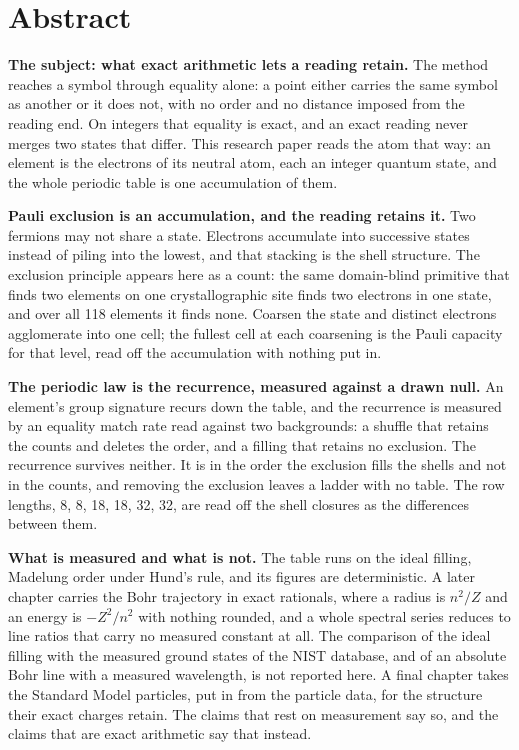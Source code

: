 \chapter*{Abstract}

\textbf{The subject: what exact arithmetic lets a reading retain.} The method reaches a symbol through
equality alone: a point either carries the same symbol as another or it does not, with no order and
no distance imposed from the reading end. On integers that equality is exact, and an exact reading
never merges two states that differ. This research paper reads the atom that way: an element is the
electrons of its neutral atom, each an integer quantum state, and the whole periodic table is one
accumulation of them.

\textbf{Pauli exclusion is an accumulation, and the reading retains it.} Two fermions may not share a
state. Electrons accumulate into successive states instead of piling into the lowest, and that
stacking is the shell structure. The exclusion principle appears here as a count: the same
domain-blind primitive that finds two elements on one crystallographic site finds two electrons in
one state, and over all 118 elements it finds none. Coarsen the state and distinct electrons
agglomerate into one cell; the fullest cell at each coarsening is the Pauli capacity for that level,
read off the accumulation with nothing put in.

\textbf{The periodic law is the recurrence, measured against a drawn null.} An element's group
signature recurs down the table, and the recurrence is measured by an equality match rate read
against two backgrounds: a shuffle that retains the counts and deletes the order, and a filling that
retains no exclusion. The recurrence survives neither. It is in the order the exclusion fills the
shells and not in the counts, and removing the exclusion leaves a ladder with no table. The row
lengths, 8, 8, 18, 18, 32, 32, are read off the shell closures as the differences between them.

\textbf{What is measured and what is not.} The table runs on the ideal filling, Madelung order under
Hund's rule, and its figures are deterministic. A later chapter carries the Bohr trajectory in exact
rationals, where a radius is $n^2/Z$ and an energy is $-Z^2/n^2$ with nothing rounded, and a whole
spectral series reduces to line ratios that carry no measured constant at all. The comparison of the
ideal filling with the measured ground states of the NIST database, and of an absolute Bohr line with
a measured wavelength, is not reported here. A final chapter takes the Standard Model particles, put
in from the particle data, for the structure their exact charges retain. The claims that rest on
measurement say so, and the claims that are exact arithmetic say that instead.

